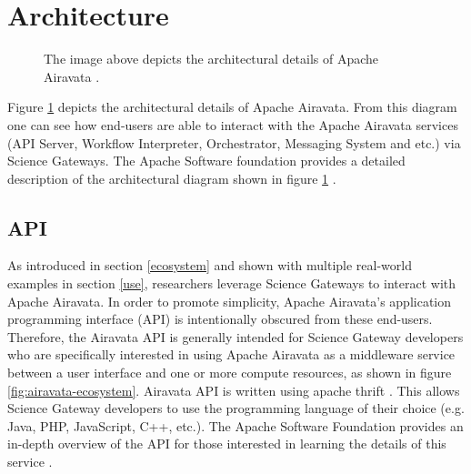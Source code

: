 \documentclass[9pt,twocolumn,twoside]{styles/osajnl}
\begin{document}
\section{Architecture} \label{architecture}
\begin{figure}[htbp]
\centering
{}
\caption{The image above depicts the architectural details of Apache
  Airavata \cite{www-documentation}.}
\label{fig:airavata-architecture}
\end{figure}
Figure \ref{fig:airavata-architecture} depicts the architectural
details of Apache Airavata. From this diagram one can see how
end-users are able to interact with the Apache Airavata services (API
Server, Workflow Interpreter, Orchestrator, Messaging System and etc.)
via Science Gateways. The Apache Software foundation provides a
detailed description of the architectural diagram shown in figure
\ref{fig:airavata-architecture} \cite{www-documentation}.

\subsection{API} \label{api}
As introduced in section \ref{ecosystem} and shown with multiple
real-world examples in section \ref{use}, researchers leverage Science
Gateways to interact with Apache Airavata. In order to promote
simplicity, Apache Airavata's application programming interface (API)
is intentionally obscured from these end-users. Therefore, the
Airavata API is generally intended for Science Gateway developers who
are specifically interested in using Apache Airavata as a middleware
service between a user interface and one or more compute resources, as
shown in figure \ref{fig:airavata-ecosystem}. Airavata API is written
using apache thrift \cite{www-documentation}. This allows Science
Gateway developers to use the programming language of their choice
(e.g. Java, PHP, JavaScript, C++, etc.). The Apache Software Foundation
provides an in-depth overview of the API for those interested in
learning the details of this service \cite{www-api}.
\end{document}
